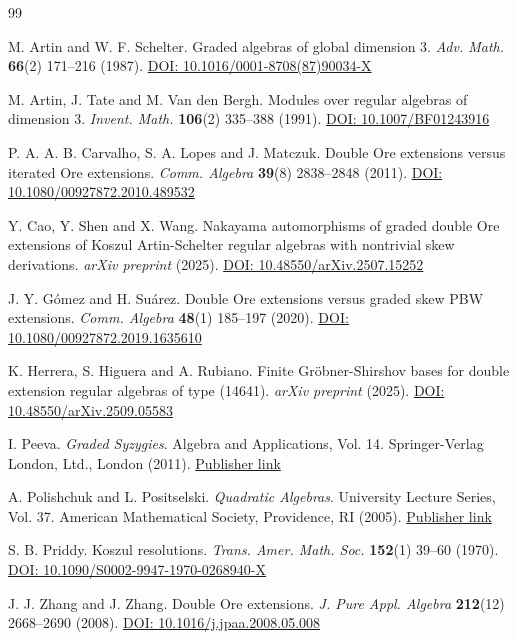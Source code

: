 \documentclass[reqno]{amsart}
\numberwithin{equation}{section}
\theoremstyle{definition}
\begin{document}
\begin{thebibliography}{99}

M. Artin and W. F. Schelter. Graded algebras of global dimension 3. {\em Adv. Math.} {\bf 66}(2) 171--216 (1987). \href{https://doi.org/10.1016/0001-8708(87)90034-X}{DOI: 10.1016/0001-8708(87)90034-X}

M. Artin, J. Tate and M. Van den Bergh. Modules over regular algebras of dimension 3. {\em Invent. Math.} {\bf 106}(2) 335--388 (1991). \href{https://doi.org/10.1007/BF01243916}{DOI: 10.1007/BF01243916}

P. A. A. B. Carvalho, S. A. Lopes and J. Matczuk. Double Ore extensions versus iterated Ore extensions. {\em Comm. Algebra} {\bf 39}(8) 2838--2848 (2011). \href{https://doi.org/10.1080/00927872.2010.489532}{DOI: 10.1080/00927872.2010.489532}

Y. Cao, Y. Shen and X. Wang. Nakayama automorphisms of graded double Ore extensions of Koszul Artin-Schelter regular algebras with nontrivial skew derivations. {\em arXiv preprint} (2025). \href{https://doi.org/10.48550/arXiv.2507.15252}{DOI: 10.48550/arXiv.2507.15252}

J. Y. G\'omez and H. Su\'arez. Double Ore extensions versus graded skew PBW extensions. {\em Comm. Algebra} {\bf 48}(1) 185--197 (2020). \href{https://doi.org/10.1080/00927872.2019.1635610}{DOI: 10.1080/00927872.2019.1635610}

K. Herrera, S. Higuera and A. Rubiano. Finite Gr\"obner-Shirshov bases for double extension regular algebras of type (14641). {\em arXiv preprint} (2025). \href{https://doi.org/10.48550/arXiv.2509.05583}{DOI: 10.48550/arXiv.2509.05583}

I. Peeva. {\em Graded Syzygies}. Algebra and Applications, Vol. 14. Springer-Verlag London, Ltd., London (2011). \href{https://link.springer.com/book/10.1007/978-0-85729-770-9}{Publisher link}

A. Polishchuk and L. Positselski. {\em Quadratic Algebras}. University Lecture Series, Vol. 37. American Mathematical Society, Providence, RI (2005). \href{https://bookstore.ams.org/ulect-37}{Publisher link}

S. B. Priddy. Koszul resolutions. {\em Trans. Amer. Math. Soc.} {\bf 152}(1) 39--60 (1970). \href{https://doi.org/10.1090/S0002-9947-1970-0268940-X}{DOI: 10.1090/S0002-9947-1970-0268940-X}

J. J. Zhang and J. Zhang. Double Ore extensions. {\em J. Pure Appl. Algebra} {\bf 212}(12) 2668--2690 (2008). \href{https://doi.org/10.1016/j.jpaa.2008.05.008}{DOI: 10.1016/j.jpaa.2008.05.008}


\end{thebibliography}
\end{document}

